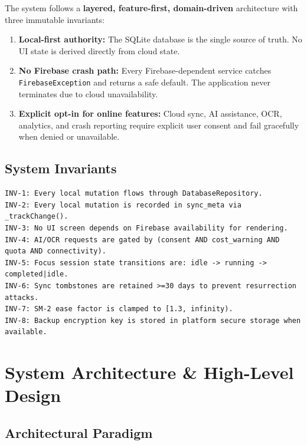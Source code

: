 \documentclass[12pt,a4paper,openany]{report}
\begin{document}
The system follows a \textbf{layered, feature-first, domain-driven} architecture with three immutable invariants:

\begin{enumerate}[leftmargin=*]
  \item \textbf{Local-first authority:} The SQLite database is the single source of truth. No UI state is derived directly from cloud state.
  \item \textbf{No Firebase crash path:} Every Firebase-dependent service catches \texttt{FirebaseException} and returns a safe default. The application never terminates due to cloud unavailability.
  \item \textbf{Explicit opt-in for online features:} Cloud sync, AI assistance, OCR, analytics, and crash reporting require explicit user consent and fail gracefully when denied or unavailable.
\end{enumerate}

\section{System Invariants}

\begin{verbatim}
INV-1: Every local mutation flows through DatabaseRepository.
INV-2: Every local mutation is recorded in sync_meta via _trackChange().
INV-3: No UI screen depends on Firebase availability for rendering.
INV-4: AI/OCR requests are gated by (consent AND cost_warning AND quota AND connectivity).
INV-5: Focus session state transitions are: idle -> running -> completed|idle.
INV-6: Sync tombstones are retained >=30 days to prevent resurrection attacks.
INV-7: SM-2 ease factor is clamped to [1.3, infinity).
INV-8: Backup encryption key is stored in platform secure storage when available.
\end{verbatim}

\chapter{System Architecture \& High-Level Design}

\section{Architectural Paradigm}
\end{document}
